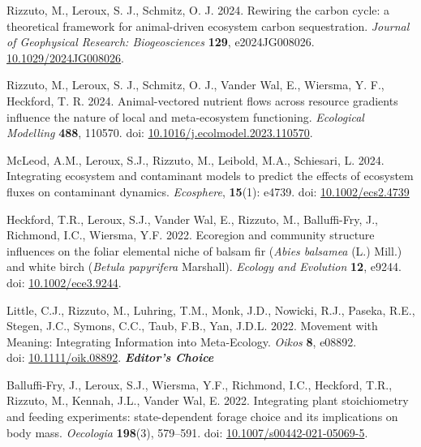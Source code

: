 \begin{etaremune}[topsep=0pt,itemsep=1pt,partopsep=0pt,parsep=0pt]
  \renewcommand\labelenumi{\bfseries\theenumi .}
  \item \textcolor{awesome}{Rizzuto, M.}, Leroux, S. J., Schmitz, O. J. 2024. Rewiring the carbon cycle: a theoretical framework for animal-driven ecosystem carbon sequestration. \emph{Journal of Geophysical Research: Biogeosciences} \textbf{129}, e2024JG008026. \href{https://agupubs.onlinelibrary.wiley.com/doi/epdf/10.1029/2024JG008026?domain=author&token=JQVUWF9NSSQKUTSE44C6}{10.1029/2024JG008026}.
  \item \textcolor{awesome}{Rizzuto, M.}, Leroux, S. J., Schmitz, O. J., Vander Wal, E., Wiersma, Y. F., Heckford, T. R. 2024. Animal-vectored nutrient flows across resource gradients influence the nature of local and meta-ecosystem functioning. \emph{Ecological Modelling} \textbf{488}, 110570. doi: \href{https://doi.org/10.1016/j.ecolmodel.2023.110570}{10.1016/j.ecolmodel.2023.110570}.
  \item McLeod, A.M., Leroux, S.J., \textcolor{awesome}{Rizzuto, M.}, Leibold, M.A., Schiesari, L. 2024. Integrating ecosystem and contaminant models to predict the effects of ecosystem fluxes on contaminant dynamics. \emph{Ecosphere}, \textbf{15}(1): e4739. doi: \href{https://doi.org/10.1002/ecs2.4739}{10.1002/ecs2.4739}
  \item Heckford, T.R., Leroux, S.J., Vander Wal, E., \textcolor{awesome}{Rizzuto, M.}, Balluffi-Fry, J., Richmond, I.C., Wiersma, Y.F. 2022. Ecoregion and community structure influences on the foliar elemental niche of balsam fir (\textit{Abies balsamea} (L.) Mill.) and white birch (\textit{Betula papyrifera} Marshall). \emph{Ecology and Evolution} \textbf{12}, e9244. doi: \href{https://doi.org/10.1002/ece3.9244}{10.1002/ece3.9244}.
  \item Little, C.J.\textsuperscript{\textdagger}, \textcolor{awesome}{Rizzuto, M.}\textsuperscript{\textdagger}, Luhring, T.M., Monk, J.D., Nowicki, R.J., Paseka, R.E., Stegen, J.C., Symons, C.C., Taub, F.B., Yan, J.D.L. 2022. Movement with Meaning: Integrating Information into Meta-Ecology. \emph{Oikos} \textbf{8}, e08892.\\ doi: \href{https://doi.org/10.1111/oik.08892}{10.1111/oik.08892}. \null\hfill\textbf{\textit{Editor's Choice}}
  \item Balluffi-Fry, J., Leroux, S.J., Wiersma, Y.F., Richmond, I.C., Heckford, T.R., \textcolor{awesome}{Rizzuto, M.}, Kennah, J.L., Vander Wal, E. 2022. Integrating plant stoichiometry and feeding experiments: state-dependent forage choice and its implications on body mass. \emph{Oecologia} \textbf{198}(3), 579--591. doi: \href{https://rdcu.be/cAY5a}{10.1007/s00442-021-05069-5}.

\end{etaremune}
